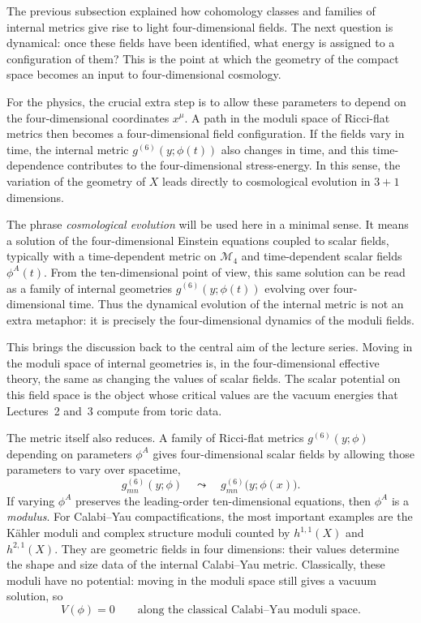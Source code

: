 The previous subsection explained how cohomology classes and
families of internal metrics give rise to light four-dimensional
fields.  The next question is dynamical: once these fields have been
identified, what energy is assigned to a configuration of them?  This
is the point at which the geometry of the compact space becomes an
input to four-dimensional cosmology.

For the physics, the crucial extra step is to allow these parameters
to depend on the four-dimensional coordinates $x^\mu$.  A path in the
moduli space of Ricci-flat metrics then becomes a four-dimensional
field configuration.  If the fields vary in time, the internal metric
$g^{(6)}(y;\phi(t))$ also changes in time, and this time-dependence
contributes to the four-dimensional stress-energy.  In this sense, the
variation of the geometry of $X$ leads directly to cosmological
evolution in $3+1$ dimensions.

The phrase \emph{cosmological evolution} will be used here in a
minimal sense.  It means a solution of the four-dimensional Einstein
equations coupled to scalar fields, typically with a time-dependent
metric on $\mathcal{M}_4$ and time-dependent scalar fields
$\phi^A(t)$.  From the ten-dimensional point of view, this same
solution can be read as a family of internal geometries
$g^{(6)}(y;\phi(t))$ evolving over four-dimensional time.  Thus the
dynamical evolution of the internal metric is not an extra metaphor:
it is precisely the four-dimensional dynamics of the moduli fields.

This brings the discussion back to the central aim of the lecture
series.  Moving in the moduli space of internal geometries is, in the
four-dimensional effective theory, the same as changing the values of
scalar fields.  The scalar potential on this field space is the object
whose critical values are the vacuum energies that
Lectures~2 and~3 compute from toric data.


The metric itself also reduces. A family of Ricci-flat metrics
$g^{(6)}(y;\phi)$ depending on parameters $\phi^A$ gives
four-dimensional scalar fields by allowing those parameters to vary
over spacetime,
\begin{equation}
    g^{(6)}_{mn}(y;\phi)
    \quad\leadsto\quad
    g^{(6)}_{mn}\bigl(y;\phi(x)\bigr).
\end{equation}
If varying $\phi^A$ preserves the leading-order ten-dimensional
equations, then $\phi^A$ is a \emph{modulus}. 
For Calabi--Yau compactifications, the most important
examples are the K\"ahler moduli and complex structure moduli counted
by $h^{1,1}(X)$ and $h^{2,1}(X)$.  They are geometric fields in four
dimensions: their values determine the shape and size data of the
internal Calabi--Yau metric. 
Classically, these moduli have no potential:
moving in the moduli space still gives a vacuum solution, so
\begin{equation}
    V(\phi)=0
    \qquad
    \text{along the classical Calabi--Yau moduli space.}
\end{equation}


